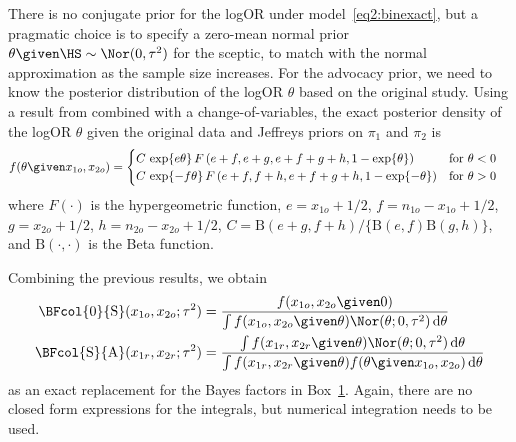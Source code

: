 There is no conjugate prior for the logOR under model~\eqref{eq2:binexact}, but a
pragmatic choice is to specify a zero-mean normal prior
$\theta \given \HS \sim \Nor(0, \tau^{2})$ for the sceptic, to match with the
normal approximation as the sample size increases. For the advocacy prior, we
need to know the posterior distribution of the logOR $\theta$ based on the
original study.
Using a result from \citet{Marshall1988} combined with a change-of-variables,
the exact posterior density of the logOR $\theta$ given the original data and
Jeffreys priors on $\pi_1$ and $\pi_2$ is
\begin{align*}
  f(\theta \given x_{1o}, x_{2o}) &=
  \begin{cases}
    C \, \exp\{e \theta\} \,
    F\left(e + f, e + g, e + f + g + h, 1 - \exp\{\theta\}\right)
    & \text{for} ~ \theta < 0 \\
    C \, \exp\{-f \theta\} \,
    F\left(e + f, f + h, e + f + g + h, 1 - \exp\{-\theta\}\right)
    & \text{for} ~ \theta > 0 \\
  \end{cases}
\end{align*}
where $F(\cdot)$ is the hypergeometric function, $e = x_{1o} + 1/2$,
$f = n_{1o} - x_{1o} + 1/2$, \mbox{$g = x_{2o} + 1/2$},
$h = n_{2o} - x_{2o} + 1/2$,
$C = \text{B}(e + g, f + h)/\{\text{B}(e, f) \text{B}(g, h)\}$, and
$\text{B}(\cdot, \cdot)$ is the Beta function.

Combining the previous results, we obtain
\begin{align*}
  \BFcol{0}{\text{S}}(x_{1o}, x_{2o};\tau^{2})
  &= \frac{ f(x_{1o}, x_{2o} \given 0)}{\int
   f(x_{1o}, x_{2o} \given \theta)
  \Nor(\theta; 0, \tau^{2}) \, \text{d}\theta} \\
  \BFcol{\text{S}}{\text{A}}(x_{1r}, x_{2r};\tau^{2})
  &= \frac{\int f(x_{1r}, x_{2r} \given \theta)
    \Nor(\theta; 0, \tau^{2}) \, \text{d}\theta}{
    \int f(x_{1r}, x_{2r} \given \theta)
    f(\theta \given x_{1o}, x_{2o}) \, \text{d} \theta}
\end{align*}
as an exact replacement for the Bayes factors in Box~\hyperref[box:nutshell]{1}.
Again, there are no closed form expressions for the integrals, but numerical
integration needs to be used.



